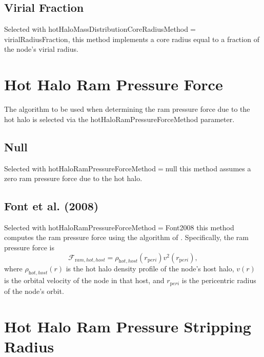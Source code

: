 \subsection{Virial Fraction}\label{phys:hotHaloMassDistributionCoreRadius:hotHaloMassDistributionCoreRadiusVirialFraction}

Selected with {\normalfont \ttfamily hotHaloMassDistributionCoreRadiusMethod}$=${\normalfont \ttfamily virialRadiusFraction}, this method implements a core radius equal to a fraction {\normalfont \ttfamily [coreRadiusOverVirialRadius]} of the node's virial radius.

\section{Hot Halo Ram Pressure Force}\label{sec:HotHaloRamPressureForce}

The algorithm to be used when determining the ram pressure force due to the hot halo is selected via the {\normalfont \ttfamily hotHaloRamPressureForceMethod} parameter.

\subsection{Null}

Selected with {\normalfont \ttfamily hotHaloRamPressureForceMethod}$=${\normalfont \ttfamily null} this method assumes a zero ram pressure force due to the hot halo.

\subsection{Font et al. (2008)}

Selected with {\normalfont \ttfamily hotHaloRamPressureForceMethod}$=${\normalfont \ttfamily Font2008} this method computes the ram pressure force using the algorithm of \cite{font_colours_2008}. Specifically, the ram pressure force is
\begin{equation}
\mathcal{F}_{\mathrm ram, hot, host} = \rho_{\mathrm hot, host}(r_{\mathrm peri}) v^2(r_{\mathrm peri}),
\end{equation}
where $\rho_{\mathrm hot, host}(r)$ is the hot halo density profile of the node's host halo, $v(r)$ is the orbital velocity of the node in that host, and $r_{\mathrm peri}$ is the pericentric radius of the node's orbit.

\section{Hot Halo Ram Pressure Stripping Radius}\label{sec:HotHaloRamPressureStrip}

